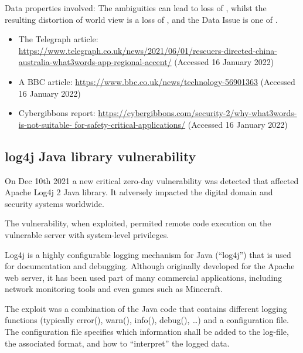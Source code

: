 Data properties involved: The ambiguities can lead to loss of ,
whilst the resulting distortion of world view is a loss of ,
and the Data Issue is one of .

\begin{itemize}
\item The Telegraph article:
  \href{https://www.telegraph.co.uk/news/2021/06/01/rescuers-directed-china-australia-what3words-app-regional-accent/}
       {https://www.telegraph.co.uk/news/2021/06/01/rescuers-directed-china- australia-what3words-app-regional-accent/}
       (Accessed 16 January 2022)
     \item A BBC article: 
       \href{https://www.bbc.co.uk/news/technology-56901363}
            {https://www.bbc.co.uk/news/technology-56901363}
       (Accessed 16 January 2022)
          \item Cybergibbons report:
            \href{https://cybergibbons.com/security-2/why-what3words-is-not-suitable-for-safety-critical-applications/}
                 {https://cybergibbons.com/security-2/why-what3words-is-not-suitable- for-safety-critical-applications/}
       (Accessed 16 January 2022)
\end{itemize}

\subsection{log4j Java library vulnerability} \label{bkm:incacc:log4j}
On Dec 10th 2021 a new critical zero-day vulnerability was detected that affected Apache Log4j 2 Java library. 
It adversely impacted the digital domain and security systems worldwide.

The vulnerability, when exploited, permited remote code execution on the vulnerable server with system-level privileges.

Log4j is a highly configurable logging mechanism for Java (“log4j”) that is used for documentation and debugging.
Although originally developed for the Apache web server, it has been used part of many commercial applications,
including network monitoring tools and even games such as Minecraft.

The exploit was a combination of the Java code that contains different logging functions
(typically error(), warn(), info(), debug(), \dots)
and a configuration file.
The configuration file specifies which \gls{information} shall be added 
to the log-file, the associated format, and how to ``interpret'' the logged data.

